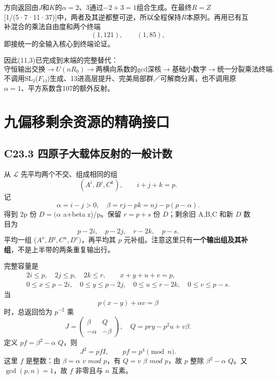 {方向返回由\ensuremath{J}和\ensuremath{K}的\ensuremath{\alpha =2}、3通过−\ensuremath{2+3=1}组合生成。在最终\ensuremath{R=Z}{[}1/(5·7·11·37){]}中，两者及其逆都整可逆，所以全程保持\ensuremath{R}本原列。再用已有互补混合的乘法自由度和两个终端} \[
(1,121),\qquad(1,85),
\] {即接统一的全输入核心到终端论证。}

{因此(11,3)已完成到末端的完整替代：} \[
\text{守恒输出交换}
\to U(nR_0)
\to \text{两横向系数的gcd深核}
\to \text{基础小数字}
\to \text{统一分裂乘法终端}.
\] {不调用SL₂(\ensuremath{F}₁₃)生成、13进高层提升、完美局部群／可解商分离，也不调用原\ensuremath{\alpha =1}、平方系数含107的额外反射。}


\section{九偏移剩余资源的精确接口}\label{construct:nine-offsets}
\subsection*{\texorpdfstring{{C23.3} {四原子大载体反射的一般计数}}{C23.3 四原子大载体反射的一般计数}}\label{C23-h152}

{从} \(\mathcal L\) {先平均两个不交、组成相同的组} \[
(A^i,B^j,C^k),\qquad i+j+k=p.
\] {记} \[
\alpha=i-j>0,\quad \beta=rj-pk=nj-p(p-\alpha).
\] {得到} {2p} {份} {\ensuremath{D=(\alpha }} {a+beta} {z)/p。保留} {\ensuremath{r=p+s}} {份} {\ensuremath{D}；剩余旧} {A,B,C} {和新} {\ensuremath{D}} {数目为} \[
p-2i,\quad p-2j,\quad r-2k,\quad p-s.
\] {平均一组} {(\ensuremath{A^{x},B^{y},C^{u},D^{v})}，再平均其} {\ensuremath{p}} {元补组。注意这里只有}\textbf{{一个输出组及其补组}}{，不是上半带的两条重复输出行。}

{完整容量是} \[
\begin{gathered}
2i\le p,\quad2j\le p,\quad2k\le r,\qquad x+y+u+v=p,\\
0\le x\le p-2i,\quad0\le y\le p-2j,\quad
0\le u\le r-2k,\quad0\le v\le p-s.
\end{gathered}
\tag{C23.3.1}
\] {当} \[
p(x-y)+\alpha v=\beta
\tag{C23.3.2}
\] {时，总返回恰为} {\ensuremath{p^{-2}}} {乘} \[
J=\begin{pmatrix}\beta&Q\\-\alpha&-\beta\end{pmatrix},
\quad Q=pry-p^2u+v\beta.
\tag{C23.3.3}
\] {定义} {\ensuremath{pf=\beta ^{2}-\alpha }} {\ensuremath{Q}，则} \[
J^2=pfI,\qquad pf=p^4\pmod n.
\tag{C23.3.4}
\] {这里} {\ensuremath{f}} {是整数：由} {\ensuremath{\beta =\alpha }} {\ensuremath{v}} {\ensuremath{mod}} {\ensuremath{p}，有} {\ensuremath{Q=v}} {\ensuremath{\beta }} {\ensuremath{mod}} {\ensuremath{p}，故} {\ensuremath{p}} {整除} {\ensuremath{\beta ^{2}-\alpha }} {\ensuremath{Q}。又} {\ensuremath{\operatorname{gcd}(p,n)=1}，故} {\ensuremath{f}} {非零且与} {\ensuremath{n}} {互素。}

